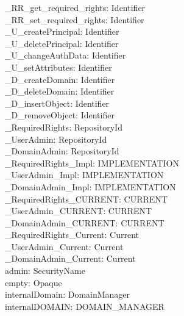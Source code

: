 \begin{axdef}
  \_RR\_get\_required\_rights: Identifier \\
  \_RR\_set\_required\_rights: Identifier \\
  \_U\_createPrincipal: Identifier \\
  \_U\_deletePrincipal: Identifier \\
  \_U\_changeAuthData: Identifier \\
  \_U\_setAttributes: Identifier \\
  \_D\_createDomain: Identifier \\
  \_D\_deleteDomain: Identifier \\
  \_D\_insertObject: Identifier \\
  \_D\_removeObject: Identifier \\
  \_RequiredRights: RepositoryId \\
  \_UserAdmin: RepositoryId \\
  \_DomainAdmin: RepositoryId \\
  \_RequiredRights\_Impl: IMPLEMENTATION \\
  \_UserAdmin\_Impl: IMPLEMENTATION \\
  \_DomainAdmin\_Impl: IMPLEMENTATION \\
  \_RequiredRights\_CURRENT: CURRENT \\
  \_UserAdmin\_CURRENT: CURRENT \\
  \_DomainAdmin\_CURRENT: CURRENT \\
  \_RequiredRights\_Current: Current \\
  \_UserAdmin\_Current: Current \\
  \_DomainAdmin\_Current: Current \\
  admin: SecurityName \\
  empty: Opaque \\
  internalDomain: DomainManager \\
  internalDOMAIN: DOMAIN\_MANAGER \\
\end{axdef}

